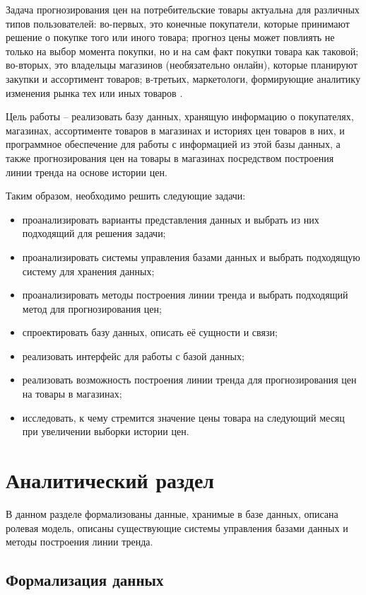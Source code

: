 \documentclass{bmstu}
\begin{document}
Задача прогнозирования цен на потребительские товары актуальна для различных типов пользователей: во-первых, это конечные покупатели, которые принимают решение о покупке того или иного товара; прогноз цены может повлиять не только на выбор момента покупки, но и на сам факт покупки товара как таковой; во-вторых, это владельцы магазинов (необязательно онлайн), которые планируют закупки и ассортимент товаров; в-третьих, маркетологи, формирующие аналитику изменения рынка тех или иных товаров \cite{met_pred_online}.

Цель работы -- реализовать базу данных, хранящую информацию о покупателях, магазинах, ассортименте товаров в магазинах и историях цен товаров в них, и программное обеспечение для работы с информацией из этой базы данных, а также прогнозирования цен на товары в магазинах посредством построения линии тренда на основе истории цен.

Таким образом, необходимо решить следующие задачи:

\begin{itemize}
	\item проанализировать варианты представления данных и выбрать из них подходящий для решения задачи;
	\item проанализировать системы управления базами данных и выбрать подходящую систему для хранения данных;
	\item проанализировать методы построения линии тренда и выбрать подходящий метод для прогнозирования цен;
	\item спроектировать базу данных, описать её сущности и связи;
	\item реализовать интерфейс для работы с базой данных;
	\item реализовать возможность построения линии тренда для прогнозирования цен на товары в магазинах;
	\item исследовать, к чему стремится значение цены товара на следующий месяц при увеличении выборки истории цен.
\end{itemize}
	
\chapter{Аналитический раздел}

В данном разделе формализованы данные, хранимые в базе данных, описана ролевая модель, описаны существующие системы управления базами данных и методы построения линии тренда.

\section{Формализация данных}
\end{document}
